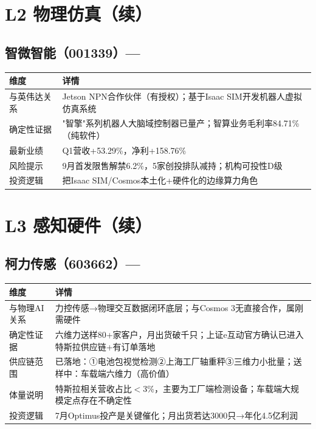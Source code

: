 \section{L2 物理仿真（续）}

\subsection{智微智能（001339）--- \starfour{}}

\begin{table}[H]
\centering\small
\renewcommand{\arraystretch}{1.3}
\begin{tabularx}{\textwidth}{l X}
\toprule
\textbf{维度} & \textbf{详情} \\
\midrule
与英伟达关系 & Jetson NPN合作伙伴（有授权）；基于Isaac SIM开发机器人虚拟仿真系统 \\
确定性证据 & "智擎"系列机器人大脑域控制器已量产；智算业务毛利率84.71\%（纯软件） \\
最新业绩 & Q1营收+53.29\%，净利+158.76\% \\
风险提示 & \textcolor{riskred}{9月首发限售解禁6.2\%，5家创投排队减持；机构可投性D级} \\
投资逻辑 & 把Isaac SIM/Cosmos本土化+硬件化的边缘算力角色 \\
\bottomrule
\end{tabularx}
\end{table}

\section{L3 感知硬件（续）}

\subsection{柯力传感（603662）--- \starfour{}}

\begin{table}[H]
\centering\small
\renewcommand{\arraystretch}{1.3}
\begin{tabularx}{\textwidth}{l X}
\toprule
\textbf{维度} & \textbf{详情} \\
\midrule
与物理AI关系 & 力控传感→物理交互数据闭环底层；与Cosmos 3无直接合作，属刚需硬件 \\
确定性证据 & 六维力送样80+家客户，月出货破千只；上证e互动官方确认已进入特斯拉供应链+有订单落地 \\
供应链范围 & 已落地：①电池包视觉检测②上海工厂轴重秤③三维力小批量；送样中：车载端六维力（高价值） \\
体量说明 & \textcolor{riskamber}{特斯拉相关营收占比$<$3\%，主要为工厂端检测设备；车载端大规模定点存在不确定性} \\
投资逻辑 & 7月Optimus投产是关键催化；月出货若达3000只→年化4.5亿利润 \\
\bottomrule
\end{tabularx}
\end{table}


